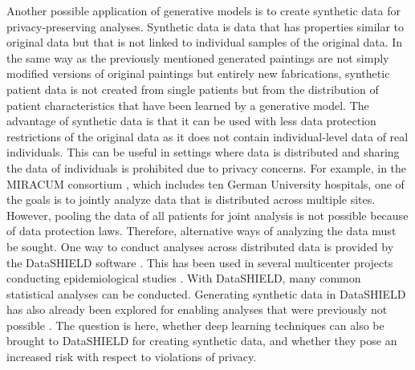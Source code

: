 \documentclass[12pt]{article}
\begin{document}
Another possible application of generative models is to create synthetic data for privacy-preserving analyses.
Synthetic data is data that has properties similar to original data but that is not linked to individual samples of the original data.
In the same way as the previously mentioned generated paintings are not simply modified versions of original paintings but entirely new fabrications,
synthetic patient data is not created from single patients but from the distribution of patient characteristics that have been learned by a generative model.
The advantage of synthetic data is that it can be used with less data protection restrictions of the original data as it does not contain individual-level data of real individuals.
This can be useful in settings where data is distributed and sharing the data of individuals is prohibited due to privacy concerns.
For example, in the MIRACUM consortium \citep{prokosch_miracum_2018}, which includes ten German University hospitals,
one of the goals is to jointly analyze data that is distributed across multiple sites.
However, pooling the data of all patients for joint analysis is not possible because of data protection laws.
Therefore, alternative ways of analyzing the data must be sought. 
One way to conduct analyses across distributed data is provided by the DataSHIELD software \citep{gaye_datashield,budin-ljosne_datashield}.
This has been used in several multicenter projects conducting epidemiological studies \citep{doiron_datashield_2013, pastorino_datashield_2019, oluwagbemigun_datashield_2020}.
With DataSHIELD, many common statistical analyses can be conducted.
Generating synthetic data in DataSHIELD has also already been explored for enabling analyses that were previously not possible \citep{bonofiglio2020}.
The question is here, whether deep learning techniques can also be brought to DataSHIELD for creating synthetic data, and whether they pose an increased risk with respect to violations of privacy.

\end{document}
